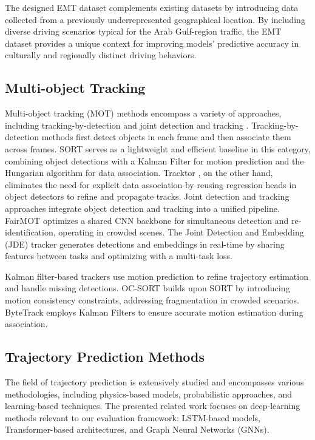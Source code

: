 The designed EMT dataset complements existing datasets by introducing data collected from a previously underrepresented geographical location. By including diverse driving scenarios typical for the Arab Gulf-region traffic, the EMT dataset provides a unique context for improving models' predictive accuracy in culturally and regionally distinct driving behaviors.

\subsection{Multi-object Tracking}
Multi-object tracking (MOT) methods encompass a variety of approaches, including tracking-by-detection \cite{8296962, 9010033} and joint detection and tracking \cite{zhang2021fairmot, 10.1007/978-3-030-58621-8_7}. Tracking-by-detection methods first detect objects in each frame and then associate them across frames. SORT \cite{8296962} serves as a lightweight and efficient baseline in this category, combining object detections with a Kalman Filter for motion prediction and the Hungarian algorithm for data association. Tracktor \cite{9010033}, on the other hand, eliminates the need for explicit data association by reusing regression heads in object detectors to refine and propagate tracks. Joint detection and tracking approaches integrate object detection and tracking into a unified pipeline. FairMOT \cite{zhang2021fairmot} optimizes a shared CNN backbone for simultaneous detection and re-identification, operating in crowded scenes. The Joint Detection and Embedding (JDE) tracker \cite{10.1007/978-3-030-58621-8_7} generates detections and embeddings in real-time by sharing features between tasks and optimizing with a multi-task loss.

Kalman filter-based trackers \cite{BoT-SORT, bytetrack, 8296962, 10406854,10160328} use motion prediction to refine trajectory estimation and handle missing detections. OC-SORT \cite{cao2023observation} builds upon SORT by introducing motion consistency constraints, addressing fragmentation in crowded scenarios. ByteTrack \cite{bytetrack} employs Kalman Filters to ensure accurate motion estimation during association.

\subsection{Trajectory Prediction Methods}

The field of trajectory prediction is extensively studied and encompasses various methodologies, including physics-based models, probabilistic approaches, and learning-based techniques. The presented related work focuses on deep-learning methods relevant to our evaluation framework: LSTM-based models, Transformer-based architectures, and Graph Neural Networks (GNNs).


